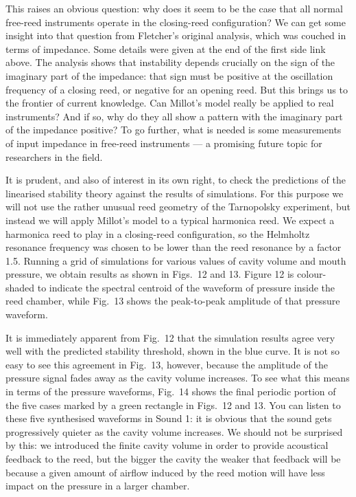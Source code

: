   This raises an obvious question: why does it seem to be the case that all 
  normal free-reed instruments operate in the closing-reed configuration? We 
  can get some insight into that question from Fletcher’s original analysis, 
  which was couched in terms of impedance. Some details were given at the end 
  of the first side link above. The analysis shows that instability depends 
  crucially on the sign of the imaginary part of the impedance: that sign must 
  be positive at the oscillation frequency of a closing reed, or negative for 
  an opening reed. But this brings us to the frontier of current knowledge. Can 
  Millot's model really be applied to real instruments? And if so, why do they 
  all show a pattern with the imaginary part of the impedance positive? To go 
  further, what is needed is some measurements of input impedance in free-reed 
  instruments — a promising future topic for researchers in the field. 

  It is prudent, and also of interest in its own right, to check the 
  predictions of the linearised stability theory against the results of 
  simulations. For this purpose we will not use the rather unusual reed 
  geometry of the Tarnopolsky experiment, but instead we will apply Millot’s 
  model to a typical harmonica reed. We expect a harmonica reed to play in a 
  closing-reed configuration, so the Helmholtz resonance frequency was chosen 
  to be lower than the reed resonance by a factor 1.5. Running a grid of 
  simulations for various values of cavity volume and mouth pressure, we obtain 
  results as shown in Figs.\ 12 and 13. Figure 12 is colour-shaded to indicate 
  the spectral centroid of the waveform of pressure inside the reed chamber, 
  while Fig.\ 13 shows the peak-to-peak amplitude of that pressure waveform. 

  It is immediately apparent from Fig.\ 12 that the simulation results agree 
  very well with the predicted stability threshold, shown in the blue curve. It 
  is not so easy to see this agreement in Fig.\ 13, however, because the 
  amplitude of the pressure signal fades away as the cavity volume increases. 
  To see what this means in terms of the pressure waveforms, Fig.\ 14 shows the 
  final periodic portion of the five cases marked by a green rectangle in 
  Figs.\ 12 and 13. You can listen to these five synthesised waveforms in Sound 
  1: it is obvious that the sound gets progressively quieter as the cavity 
  volume increases. We should not be surprised by this: we introduced the 
  finite cavity volume in order to provide acoustical feedback to the reed, but 
  the bigger the cavity the weaker that feedback will be because a given amount 
  of airflow induced by the reed motion will have less impact on the pressure 
  in a larger chamber. 

